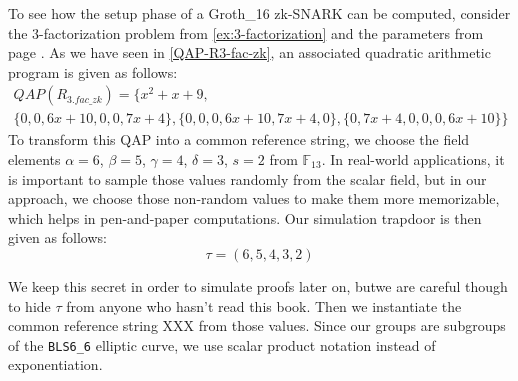 \begin{example}
To see how the setup phase of a Groth\_16 zk-SNARK can be computed, consider the $3$-factorization problem from \ref{ex:3-factorization} and the parameters from page \pageref{groth16-parameters}. As we have seen in \ref{QAP-R3-fac-zk}, an associated quadratic arithmetic program is given as follows:
\begin{multline*}
QAP(R_{3.fac\_zk}) =\{x^{2}+x+9,\\
 \{0,0,6x+10,0,0,7x+4\},\{0,0,0,6x+10,7x+4,0\},\{0,7x+4,0,0,0,6x+10\}\}
\end{multline*}
To transform this QAP into a common reference string, we choose the  field elements $\alpha=6$, $\beta=5$, $\gamma=4$, $\delta=3$, $s=2$ from $\mathbb{F}_{13}$. 
In real-world applications, it is important to sample those values randomly from the scalar field, but in our approach, we choose those non-random values to make them more memorizable, which helps in pen-and-paper computations. Our simulation trapdoor is then given as follows:
$$
\tau = (6,5,4,3,2)
$$

We keep this secret in order to simulate proofs later on, butwe are careful though to hide $\tau$ from anyone who hasn't read this book. Then we instantiate the common reference string XXX from those values. Since our groups are subgroups of the \texttt{BLS6\_6} elliptic curve, we use scalar product notation instead of exponentiation. 


\end{example}
